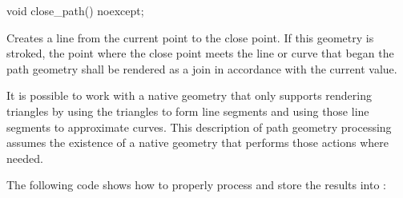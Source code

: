 \begin{itemdecl}
  void close_path() noexcept;
\end{itemdecl}
\begin{itemdescr}
	\pnum
	\effects
	Creates a line from the current point to the close point. If this geometry is stroked, the point where the close point meets the line or curve that began the path geometry shall be rendered as a join in accordance with the current  value.

\end{itemdescr}

\pnum
\enternote
It is possible to work with a native geometry that only supports rendering triangles by using the triangles to form line segments and using those line segments to approximate curves. This description of path geometry processing assumes the existence of a native geometry that performs those actions where needed.
\exitnote

\pnum
The following code shows how to properly process  and store the results into :


